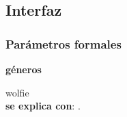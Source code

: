 \subsection{Interfaz}


  \subsubsection{Par\'ametros formales}
   \parbox{1.7cm}{\textbf{g\'eneros}} wolfie\\

  \textbf{se explica con}: .


